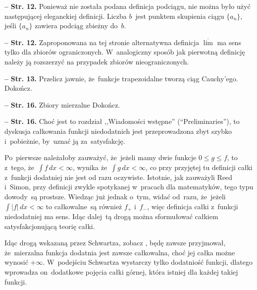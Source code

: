 \documentclass[a4paper,11pt]{article}
\newcommand{\ol}{\overline}
\newcommand{\Limsup}{\ol{\lim}}
\newcommand{\Int}{\int\limits}
\newcommand{\IntCaD}[2] { \Int #1 \, d#2 } %
\providecommand{\absj}[1]{\lvert #1 \rvert}
\newcommand{\tb}{\textbf}
\newcommand{\noi}{\noindent}
\newcommand{\start}{\noi \tb{--} {}}
\newcommand{\Str}[1]{\tb{Str. #1.}}
\newcommand{\Dok}{{\color{red} Dokończ.}}
\begin{document}
\start \Str{12} Ponieważ nie została podana definicja podciągu, nie
można było użyć następującej eleganckiej definicji. Liczba $b$~jest
punktem skupienia ciągu $\{ a_{ n } \}$, jeśli $\{ a_{ n } \}$ zawiera
podciąg zbieżny do~$b$. %


\start \Str{12} Zaproponowana na tej stronie alternatywna definicja
$\Limsup$ ma sens tylko dla zbiorów ograniczonych. W~analogiczny
sposób jak pierwotną definicję należy ją rozszerzyć na przypadek
zbiorów nieograniczonych. %


\start \Str{13} Przelicz jawnie, że~funkcje trapezoidalne tworzą ciąg
Cauchy'ego. \Dok


\start \Str{16} Zbiory mierzalne \Dok


\start \Str{16} Choć jest to rozdział ,,Wiadomości wstępne''
(``Preliminaries''), to dyskusja całkowania funkcji niedodatnich jest
przeprowadzona zbyt szybko i~pobieżnie, by~uznać ją za~satysfakcję.

Po~pierwsze należałoby zauważyć, że~jeżeli mamy dwie funkcje
$0 \leq g \leq f$, to z~tego, że~$\IntCaD{ f }{ x } < \infty$, wynika
że~$\IntCaD{ g }{ x } < \infty$, co przy przyjętej tu definicji całki
z~funkcji dodatniej nie jest od razu oczywiste. Istotnie, jak
zauważyli Reed i~Simon, przy definicji zwykle spotykanej w~pracach dla
matematyków, tego typu dowody~są prostsze. Wiedząc już jednak o~tym,
widać od~razu, że~jeżeli $\IntCaD{ \absj{ f } }{ x } < \infty$ to
całkowalne~są również $f_{ + }$ i~$f_{ - }$, więc definicja całki
z~funkcji niedodatniej ma sens. Idąc dalej~tą drogą można sformułować
całkiem satysfakcjonującą teorię całki.

Idąc drogą wskazaną przez Schwartza, zobacz \cite{Schwartz79}, będę
zawsze przyjmował, że~mierzalna funkcja dodatnia jest zawsze
całkowalna, choć jej całka możne wynosić $+\infty$. W~podejściu
Schwartza wystarczy tylko dodatniość funkcji, dlatego wprowadza
on~dodatkowe pojęcia całki górnej, która istniej dla każdej takiej
funkcji.

\end{document}
